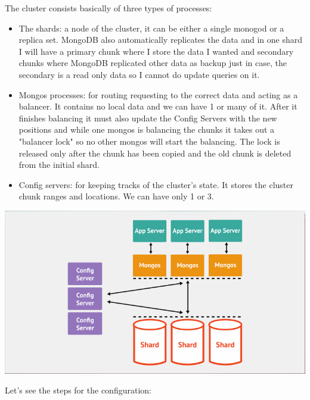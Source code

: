 \documentclass[a4page, 11pt]{article}
\begin{document}
The cluster consists basically of three types of processes:
\begin{itemize}[noitemsep]
	\item The shards: a node of the cluster, it can be either a single monogod or a replica set. 
	MongoDB also automatically replicates the data and in one shard I will have a primary chunk where I store the data I wanted and secondary chunks where MongoDB replicated other data as backup just in case, the secondary is a read only data so I cannot do update queries on it.
	\item Mongos processes: for routing requesting to the correct data and acting as a balancer. It contains no local data and we can have 1 or many of it. After it finishes balancing it must also update the Config Servers with the new positions and while one mongos is balancing the chunks it takes out a "balancer lock" so no other mongos will start the balancing. The lock is released only after the chunk has been copied and the old chunk is deleted from the initial shard.
	\item Config servers: for keeping tracks of the cluster's state. It stores the cluster chunk ranges and locations.
	We can have only 1 or 3.
\end{itemize}

\begin{center}
	\includegraphics[scale=0.50]{IMAGE6.png}
\end{center}


Let's see the steps for the configuration:
\end{document}
